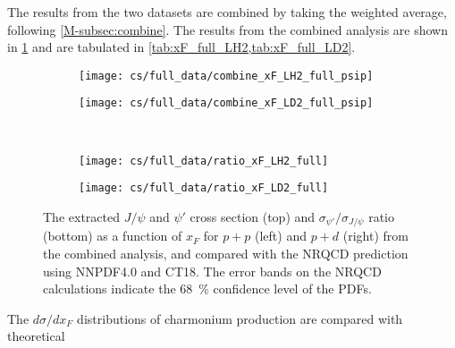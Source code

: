 \documentclass[../main.tex]{subfiles}
\begin{document}
The results from the two datasets are combined by taking the weighted average, following \cref{M-subsec:combine}.
The results from the combined analysis are shown in \cref{fig:cs_xF_full} and are tabulated in
\cref{tab:xF_full_LH2,tab:xF_full_LD2}.
\begin{figure}
	\centering
	\begin{subfigure}{0.48\linewidth}
		\texttt{[image: cs/full\_data/combine\_xF\_LH2\_full\_psip]}
	\end{subfigure}
	\begin{subfigure}{0.48\linewidth}
		\texttt{[image: cs/full\_data/combine\_xF\_LD2\_full\_psip]}
	\end{subfigure}\\
	\begin{subfigure}{0.48\linewidth}
		\texttt{[image: cs/full\_data/ratio\_xF\_LH2\_full]}
	\end{subfigure}
	\begin{subfigure}{0.48\linewidth}
		\texttt{[image: cs/full\_data/ratio\_xF\_LD2\_full]}
	\end{subfigure}
	\caption{The extracted $J/\psi$ and $\psi'$ cross section (top) and $\sigma_{\psi'}/\sigma_{J/\psi}$
		ratio (bottom) as a function of $x_F$ for $p+p$ (left) and $p+d$ (right) from
		the combined analysis, and compared with the NRQCD prediction using NNPDF4.0 and CT18.
		The error bands on the NRQCD calculations indicate the \SI{68}{\percent} confidence level of the PDFs.}
	\label{fig:cs_xF_full}
\end{figure}
\begin{table}[h!]
	\centering
	\caption{Cross section as a function of $x_F$ (in \unit{\nano\barn\per nucleon}) and the
		$\sigma_{\psi'}/\sigma_{J/\psi}$ ratio for $p+p$ extracted from the combined analysis, with
		their statistical and systematic uncertainties and the average $x_F$ in each bin.}
	
	\label{tab:xF_full_LH2}
\end{table}
\begin{table}[h!]
	\centering
	\caption{Cross section as a function of $x_F$ (in \unit{\nano\barn\per nucleon}) and the
		$\sigma_{\psi'}/\sigma_{J/\psi}$ ratio for $p+d$ extracted from the combined analysis, with
		their statistical and systematic uncertainties and the average $x_F$ in each bin.}
	
	\label{tab:xF_full_LD2}
\end{table}
The $d\sigma/dx_F$ distributions of charmonium production are compared with theoretical
\end{document}
